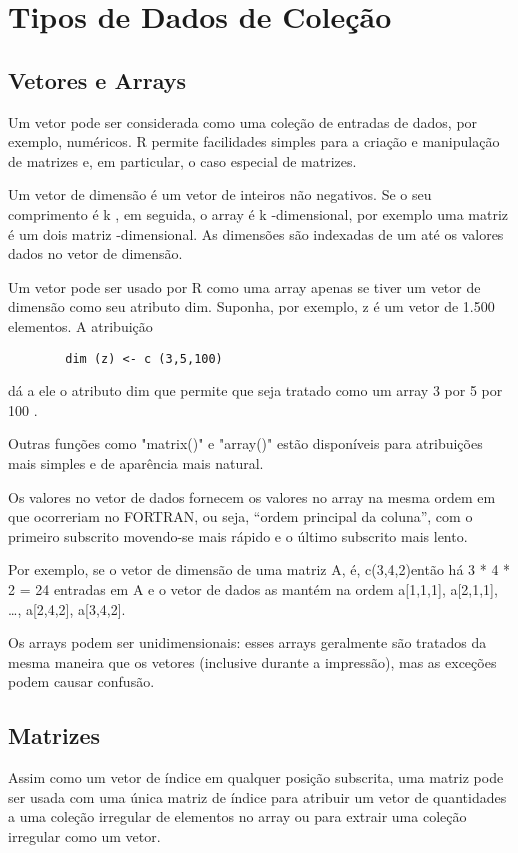   \section{Tipos de Dados de Coleção}
    \subsection{Vetores e Arrays}
      Um vetor pode ser considerada como uma coleção de entradas de dados, por exemplo, numéricos. R permite facilidades simples para a criação e manipulação de matrizes e, em particular, o caso especial de matrizes.
      
      Um vetor de dimensão é um vetor de inteiros não negativos. Se o seu comprimento é k , em seguida, o array é k -dimensional, por exemplo uma matriz é um dois matriz -dimensional. As dimensões são indexadas de um até os valores dados no vetor de dimensão.
      
      Um vetor pode ser usado por R como uma array apenas se tiver um vetor de dimensão como seu atributo dim. Suponha, por exemplo, z é um vetor de 1.500 elementos. A atribuição
      
      \color{blue}
      \begin{verbatim}
      	dim (z) <- c (3,5,100)
      \end{verbatim}
      \color{black}
      
      dá a ele o atributo dim que permite que seja tratado como um array 3 por 5 por 100 .
      
      Outras funções como "matrix()" e "array()" estão disponíveis para atribuições mais simples e de aparência mais natural.
      
      Os valores no vetor de dados fornecem os valores no array na mesma ordem em que ocorreriam no FORTRAN, ou seja, “ordem principal da coluna”, com o primeiro subscrito movendo-se mais rápido e o último subscrito mais lento.
      
      Por exemplo, se o vetor de dimensão de uma matriz A, é, c(3,4,2)então há 3 * 4 * 2 = 24 entradas em A e o vetor de dados as mantém na ordem a[1,1,1], a[2,1,1], …, a[2,4,2], a[3,4,2].
      
      Os arrays podem ser unidimensionais: esses arrays geralmente são tratados da mesma maneira que os vetores (inclusive durante a impressão), mas as exceções podem causar confusão.
    \subsection{Matrizes}
      Assim como um vetor de índice em qualquer posição subscrita, uma matriz pode ser usada com uma única matriz de índice para atribuir um vetor de quantidades a uma coleção irregular de elementos no array ou para extrair uma coleção irregular como um vetor.

